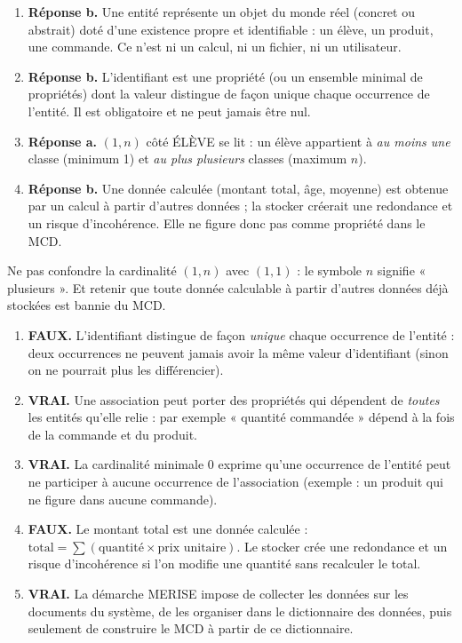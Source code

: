 \documentclass[11pt]{article}
\begin{document}
\begin{corrige}
\begin{enumerate}
\item \textbf{Réponse b.} Une entité représente un objet du monde réel (concret ou abstrait) doté d'une existence propre et identifiable : un élève, un produit, une commande. Ce n'est ni un calcul, ni un fichier, ni un utilisateur.
\item \textbf{Réponse b.} L'identifiant est une propriété (ou un ensemble minimal de propriétés) dont la valeur distingue de façon unique chaque occurrence de l'entité. Il est obligatoire et ne peut jamais être nul.
\item \textbf{Réponse a.} $(1, n)$ côté ÉLÈVE se lit : un élève appartient à \emph{au moins une} classe (minimum 1) et \emph{au plus plusieurs} classes (maximum $n$).
\item \textbf{Réponse b.} Une donnée calculée (montant total, âge, moyenne) est obtenue par un calcul à partir d'autres données ; la stocker créerait une redondance et un risque d'incohérence. Elle ne figure donc pas comme propriété dans le MCD.
\end{enumerate}
\end{corrige}

\begin{attention}
Ne pas confondre la cardinalité $(1, n)$ avec $(1, 1)$ : le symbole $n$ signifie « plusieurs ». Et retenir que toute donnée calculable à partir d'autres données déjà stockées est bannie du MCD.
\end{attention}

\begin{corrige}
\begin{enumerate}
\item \textbf{FAUX.} L'identifiant distingue de façon \emph{unique} chaque occurrence de l'entité : deux occurrences ne peuvent jamais avoir la même valeur d'identifiant (sinon on ne pourrait plus les différencier).
\item \textbf{VRAI.} Une association peut porter des propriétés qui dépendent de \emph{toutes} les entités qu'elle relie : par exemple « quantité commandée » dépend à la fois de la commande et du produit.
\item \textbf{VRAI.} La cardinalité minimale $0$ exprime qu'une occurrence de l'entité peut ne participer à aucune occurrence de l'association (exemple : un produit qui ne figure dans aucune commande).
\item \textbf{FAUX.} Le montant total est une donnée calculée : $\text{total} = \sum (\text{quantité} \times \text{prix unitaire})$. Le stocker crée une redondance et un risque d'incohérence si l'on modifie une quantité sans recalculer le total.
\item \textbf{VRAI.} La démarche MERISE impose de collecter les données sur les documents du système, de les organiser dans le dictionnaire des données, puis seulement de construire le MCD à partir de ce dictionnaire.
\end{enumerate}
\end{corrige}
\end{document}
